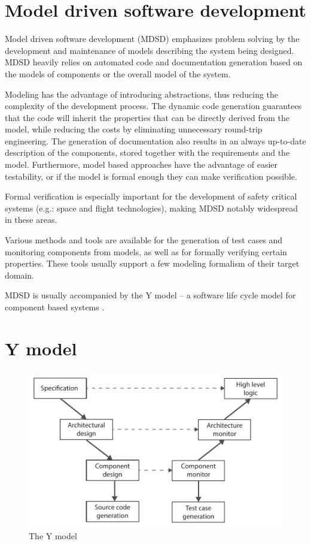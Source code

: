 \section{Model driven software development}

Model driven software development (MDSD) emphasizes problem solving by the development and maintenance of models describing the system being designed. MDSD heavily relies on automated code and documentation generation based on the models of components or the overall model of the system. 

Modeling has the advantage of introducing abstractions, thus reducing the complexity of the development process. The dynamic code generation guarantees that the code will inherit the properties that can be directly derived from the model, while reducing the costs by eliminating unnecessary round-trip engineering. The generation of documentation also results in an always up-to-date description of the components, stored together with the requirements and the model. Furthermore, model based approaches have the advantage of easier testability, or if the model is formal enough they can make verification possible.

Formal verification is especially important for the development of safety critical systems (e.g.: space and flight technologies), making MDSD notably widespread in these areas.

Various methods and tools are available for the generation of test cases and monitoring components from models, as well as for formally verifying certain properties. These tools usually support a few modeling formalism of their target domain.

MDSD is usually accompanied by the Y model -- a software life cycle model for component based systems \citep{ymodel}.

\section{Y model} %

\begin{figure}[h]
	\centering
	\includegraphics[width=0.8\linewidth]{include/figures/chapter_1/YModel}
	\caption{The Y model}
	\label{fig:intro:vmodel}
\end{figure}

